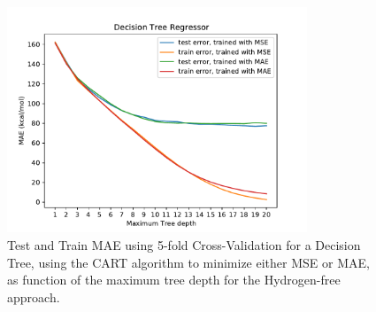 \documentclass[11pt,a4paper,notitlepage]{article}
\begin{document}
\begin{figure}[H]
\centering
\includegraphics[width=0.8\textwidth]{decision_treenoH.pdf}
\caption[Decision Tree, no H]{Test and Train MAE using 5-fold Cross-Validation for a Decision Tree, using the CART algorithm to minimize either MSE or MAE, as function of the maximum tree depth for the Hydrogen-free approach.} \label{fig:decisiontreenoH}
\end{figure}
\end{document}
